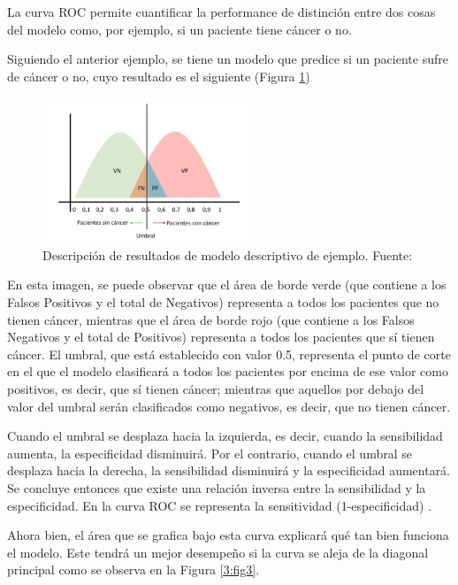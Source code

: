 \begin{itemize}
	La curva ROC permite cuantificar la performance de distinción entre dos cosas del modelo como, por ejemplo, si un paciente tiene cáncer o no.
	
	Siguiendo el anterior ejemplo, se tiene un modelo que predice si un paciente sufre de cáncer o no, cuyo resultado es el siguiente (Figura \ref{3:fig2})
	
	\begin{figure}[htbp]
		\begin{center}
			\includegraphics[width=0.55\textwidth]{3/figures/auc_example.jpg}
			\caption{Descripción de resultados de modelo descriptivo de ejemplo. Fuente: \parencite{gl_gonzalez2019auc}}
			\label{3:fig2}
		\end{center}
	\end{figure}
	
	En esta imagen, se puede observar que el área de borde verde (que contiene a los Falsos Positivos y el total de Negativos) representa a todos los pacientes que no tienen cáncer, mientras que el área de borde rojo (que contiene a los Falsos Negativos y el total de Positivos) representa a todos los pacientes que sí tienen cáncer. El umbral, que está establecido con valor 0.5, representa el punto de corte en el que el modelo clasificará a todos los pacientes por encima de ese valor como positivos, es decir, que sí tienen cáncer; mientras que aquellos por debajo del valor del umbral serán clasificados como negativos, es decir, que no tienen cáncer.
	
	Cuando el umbral se desplaza hacia la izquierda, es decir, cuando la sensibilidad aumenta, la especificidad disminuirá. Por el contrario, cuando el umbral se desplaza hacia la derecha, la sensibilidad disminuirá y la especificidad aumentará. Se concluye entonces que existe una relación inversa entre la sensibilidad y la especificidad. En la curva ROC se representa la sensitividad (1-especificidad) \parencite{gl_gonzalez2019auc}.
	
	Ahora bien, el área que se grafica bajo esta curva explicará qué tan bien funciona el modelo. Este tendrá un mejor desempeño si la curva se aleja de la diagonal principal como se observa en la Figura \ref{3:fig3}.
	

\end{itemize}
